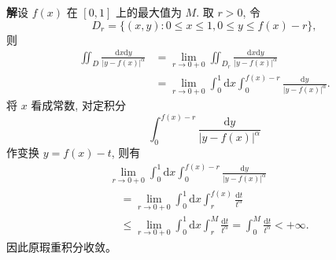 \documentclass[UTF8, 12pt, fontset=fandol, oneside]{ctexart}
\begin{document}
\noindent\textbf{解}\quad 设 $f(x)$ 在 $[0,1]$ 上的最大值为 $M$. 取 $r>0$, 令
\[
  D_r=\{(x,y):0\leqslant x\leqslant1,0\leqslant y\leqslant f(x)-r\},
\]
则
\[
\begin{aligned}
  \iint_D\frac{\mathrm dx\mathrm dy}{|y-f(x)|^\alpha}
  &=\lim_{r\to0+0}\iint_{D_r}\frac{\mathrm dx\mathrm dy}{|y-f(x)|^\alpha}\\
  &=\lim_{r\to0+0}\int_0^1\mathrm dx\int_0^{f(x)-r}
  \frac{\mathrm dy}{|y-f(x)|^\alpha}.
\end{aligned}
\]
将 $x$ 看成常数, 对定积分
\[
  \int_0^{f(x)-r}\frac{\mathrm dy}{|y-f(x)|^\alpha}
\]
作变换 $y=f(x)-t$, 则有
\[
\begin{aligned}
  &\lim_{r\to0+0}\int_0^1\mathrm dx\int_0^{f(x)-r}
  \frac{\mathrm dy}{|y-f(x)|^\alpha}\\
  &\quad=\lim_{r\to0+0}\int_0^1\mathrm dx\int_r^{f(x)}\frac{\mathrm dt}{t^\alpha}\\
  &\quad\leqslant\lim_{r\to0+0}\int_0^1\mathrm dx\int_r^M\frac{\mathrm dt}{t^\alpha}
  =\int_0^M\frac{\mathrm dt}{t^\alpha}<+\infty.
\end{aligned}
\]
因此原瑕重积分收敛。
\end{document}
